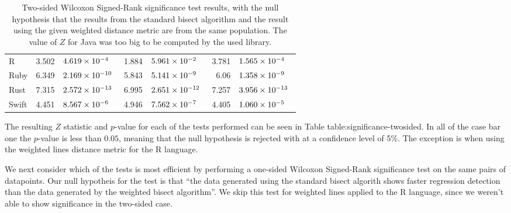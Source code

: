 \documentclass[10pt,journal,compsoc]{IEEEtran}
\begin{document}
\begin{table*}[t!]
\begin{center}
\begin{tabular}{l | r r | r r | r r}
R & 3.502 & $4.619 \times 10^{-4\0\0}$ & 1.884 & $5.961 \times 10^{-2\0\0}$ & 3.781 & $1.565 \times 10^{-4\0\0}$ \\
Ruby & 6.349 & $2.169 \times 10^{-10\0}$ & 5.843 & $5.141 \times 10^{-9\0\0}$ & 6.06\0 & $1.358 \times 10^{-9\0\0}$ \\
Rust & 7.315 & $2.572 \times 10^{-13\0}$ & 6.995 & $2.651 \times 10^{-12\0}$ & 7.257 & $3.956 \times 10^{-13\0}$ \\
Swift & 4.451 & $8.567 \times 10^{-6\0\0}$ & 4.946 & $7.562 \times 10^{-7\0\0}$ & 4.405 & $1.060 \times 10^{-5\0\0}$ \\
\end{tabular}
\caption{\label{table:significance-twosided}Two-sided Wilcoxon Signed-Rank significance test results, with the null hypothesis that the results from the standard bisect algorithm and the result using the given weighted distance metric are from the same population. The value of $Z$ for Java was too big to be computed by the used library.}
\end{center}
\end{table*}

The resulting $Z$ statistic and $p$-value for each of the tests performed can be seen in Table table:significance-twosided. In all of the case bar one the $p$-value is less than $0.05$, meaning that the null hypothesis is rejected with at a confidence level of 5\%. The exception is when using the weighted lines distance metric for the R language.

We next consider which of the tests is most efficient by performing a one-sided Wilcoxon Signed-Rank significance test on the same pairs of datapoints. Our null hypotheis for the test is that ``the data generated using the standard bisect algorith shows faster regression detection than the data generated by the weighted bisect algorithm''. We skip this test for weighted lines applied to the R language, since we weren't able to show significance in the two-sided case.
\end{document}

